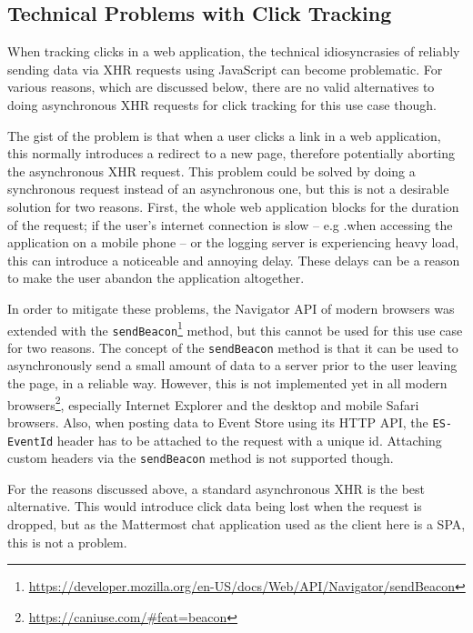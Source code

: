 \subsection{Technical Problems with Click Tracking}
\label{subsec:implementation:client:problems}

When tracking clicks in a web application, the technical idiosyncrasies of reliably sending data via \ac{XHR} requests using JavaScript can become problematic.
For various reasons, which are discussed below, there are no valid alternatives to doing asynchronous \ac{XHR} requests for click tracking for this use case though.

The gist of the problem is that when a user clicks a link in a web application, this normally introduces a redirect to a new page, therefore potentially aborting the asynchronous \ac{XHR} request\cite{Kohavi2010}.
This problem could be solved by doing a synchronous request instead of an asynchronous one, but this is not a desirable solution for two reasons.
First, the whole web application blocks for the duration of the request; if the user's internet connection is slow -- e.g .when accessing the application on a mobile phone -- or the logging server is experiencing heavy load, this can introduce a noticeable and annoying delay.
These delays can be a reason to make the user abandon the application altogether\cite{Kohavi2010,Dmitriev2017}.

In order to mitigate these problems, the Navigator \ac{API} of modern browsers was extended with the \texttt{sendBeacon}\footnote{\url{https://developer.mozilla.org/en-US/docs/Web/API/Navigator/sendBeacon}} method, but this cannot be used for this use case for two reasons.
The concept of the \texttt{sendBeacon} method is that it can be used to asynchronously send a small amount of data to a server prior to the user leaving the page, in a reliable way.
However, this is not implemented yet in all modern browsers\footnote{\url{https://caniuse.com/\#feat=beacon}}, especially Internet Explorer and the desktop and mobile Safari browsers.
Also, when posting data to Event Store using its \ac{HTTP} \ac{API}, the \texttt{ES-EventId} header has to be attached to the request with a unique id.
Attaching custom headers via the \texttt{sendBeacon} method is not supported though.

For the reasons discussed above, a standard asynchronous \ac{XHR} is the best alternative.
This would introduce click data being lost when the request is dropped, but as the Mattermost chat application used as the client here is a \ac{SPA}, this is not a problem.


